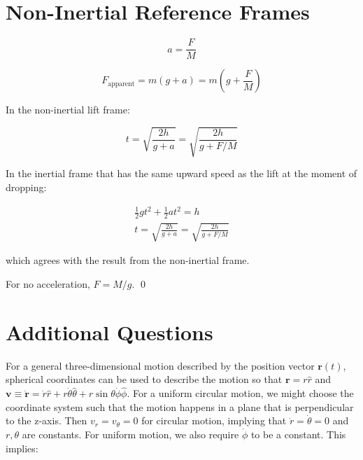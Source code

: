 \documentclass[12pt]{article}
\begin{document}
\pagebreak
\section*{Non-Inertial Reference Frames}




\begin{equation}
    a = \frac{F}{M}
\end{equation}


\begin{equation}
    F_{\text{apparent}} = m(g + a) = m(g + \frac{F}{M})
\end{equation}

In the non-inertial lift frame:

\begin{equation}
    t = \sqrt{\frac{2h}{g + a}} = \sqrt{\frac{2h}{g + F/M}}
\end{equation}

In the inertial frame that has the same upward speed as the lift at the moment of dropping:

\begin{equation}
\begin{split}
    \frac{1}{2} gt^{2} + \frac{1}{2} at^{2} = h \\
    t = \sqrt{\frac{2h}{g + a}} = \sqrt{\frac{2h}{g + F/M}}
\end{split}
\end{equation}

which agrees with the result from the non-inertial frame.

For no acceleration, $F = M/g$.
\qed


\pagebreak
\section*{Additional Questions}



For a general three-dimensional motion described by the position vector $\mathbf{r}(t)$, spherical coordinates can be used to describe the motion so that $\mathbf{r} = r \hat{r}$ and $\mathbf{v} \equiv \dot{\mathbf{r}} = \dot{r} \hat{r} + r \dot{\theta} \hat{\theta} + r \sin{\theta} \dot{\phi} \hat{\phi}$. For a uniform circular motion, we might choose the coordinate system such that the motion happens in a plane that is perpendicular to the z-axis. Then $v_{r} = v_{\theta} = 0$ for circular motion, implying that $\dot{r} = \dot{\theta} = 0$ and $r, \theta$ are constants. For uniform motion, we also require $\dot{\phi}$ to be a constant. This implies:
\end{document}
